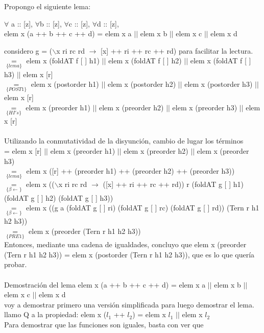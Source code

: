 \documentclass[10pt,a4paper]{article}
\begin{document}
\noindent
Propongo el siguiente lema: 
\begin{center}
	$\forall$ a :: [z], $\forall$b :: [z], $\forall$c :: [z], $\forall$d :: [z], \\
	elem x (a ++ b ++ c ++ d) = elem x a $||$ elem x b $||$ elem x c $||$ elem x d
\end{center}
\noindent
considero g = ($\backslash$x ri rc rd $\rightarrow$ [x] ++ ri ++ rc ++ rd) para facilitar la lectura.\\ 
$\underset{\{lema\}}{=}$ elem x (foldAT f [ ] h1) $||$ elem x (foldAT f [ ] h2) $||$ elem x (foldAT f [ ] h3) $||$ elem x [r] \\
$\underset{\{POST1\}}{=}$ elem x (postorder h1) $||$ elem x (postorder h2) $||$ elem x (postorder h3) $||$ elem x [r] \\
$\underset{\{HI's\}}{=}$ elem x (preorder h1) $||$ elem x (preorder h2) $||$ elem x (preorder h3) $||$ elem x [r] \\
\\
Utilizando la conmutatividad de la disyunción, cambio de lugar los términos \\
= elem x [r] $||$ elem x (preorder h1) $||$ elem x (preorder h2) $||$ elem x (preorder h3)  \\
$\underset{\{lema\}}{=}$ elem x ([r] ++ (preorder h1) ++ (preorder h2) ++ (preorder h3))  \\
$\underset{\{\beta \leftarrow\}}{=}$ elem x (($\backslash$x ri rc rd $\rightarrow$ ([x] ++ ri ++ rc ++ rd)) r (foldAT g [ ] h1) (foldAT g [ ] h2) (foldAT g [ ] h3))  \\
$\underset{\{\beta \leftarrow\}}{=}$ elem x ((g a (foldAT g [ ] ri) (foldAT g [ ] rc) (foldAT g [ ] rd)) (Tern r h1 h2 h3))  \\
$\underset{\{PRE1\}}{=}$ elem x (preorder (Tern r h1 h2 h3))  \\
Entonces, mediante una cadena de igualdades, concluyo que elem x (preorder (Tern r h1 h2 h3)) = elem x (postorder (Tern r h1 h2 h3)), que es lo que quería probar.
\\ \\
\noindent
Demostración del lema elem x (a ++ b ++ c ++ d) = elem x a $||$ elem x b $||$ elem x c $||$ elem x d \\
voy a demostrar primero una versión simplificada para luego demostrar el lema. \\
llamo Q a la propiedad: elem x ($l_1$ ++ $l_2$) = elem x $l_1$ $||$ elem x $l_2$ \\
Para demostrar que las funciones son iguales, basta con ver que 
\end{document}
